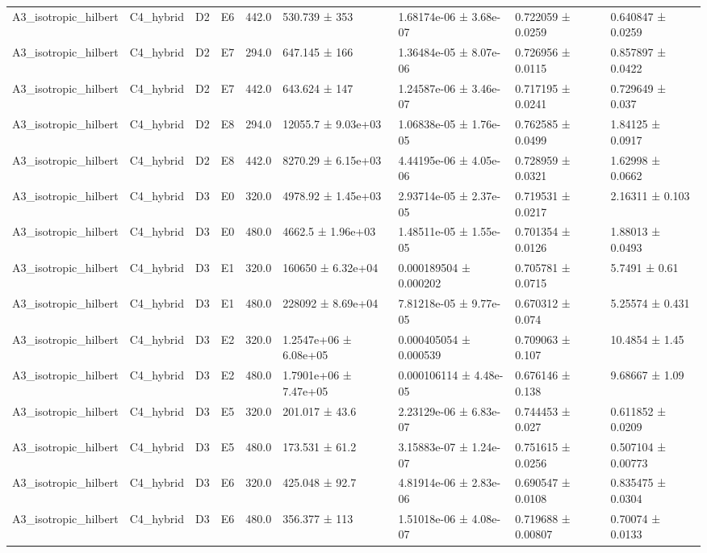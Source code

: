 \begin{table}
\begin{tabular}{lllllllll}
A3\_isotropic\_hilbert & C4\_hybrid & D2 & E6 & 442.0 & 530.739 ± 353 & 1.68174e-06 ± 3.68e-07 & 0.722059 ± 0.0259 & 0.640847 ± 0.0259 \\
A3\_isotropic\_hilbert & C4\_hybrid & D2 & E7 & 294.0 & 647.145 ± 166 & 1.36484e-05 ± 8.07e-06 & 0.726956 ± 0.0115 & 0.857897 ± 0.0422 \\
A3\_isotropic\_hilbert & C4\_hybrid & D2 & E7 & 442.0 & 643.624 ± 147 & 1.24587e-06 ± 3.46e-07 & 0.717195 ± 0.0241 & 0.729649 ± 0.037 \\
A3\_isotropic\_hilbert & C4\_hybrid & D2 & E8 & 294.0 & 12055.7 ± 9.03e+03 & 1.06838e-05 ± 1.76e-05 & 0.762585 ± 0.0499 & 1.84125 ± 0.0917 \\
A3\_isotropic\_hilbert & C4\_hybrid & D2 & E8 & 442.0 & 8270.29 ± 6.15e+03 & 4.44195e-06 ± 4.05e-06 & 0.728959 ± 0.0321 & 1.62998 ± 0.0662 \\
A3\_isotropic\_hilbert & C4\_hybrid & D3 & E0 & 320.0 & 4978.92 ± 1.45e+03 & 2.93714e-05 ± 2.37e-05 & 0.719531 ± 0.0217 & 2.16311 ± 0.103 \\
A3\_isotropic\_hilbert & C4\_hybrid & D3 & E0 & 480.0 & 4662.5 ± 1.96e+03 & 1.48511e-05 ± 1.55e-05 & 0.701354 ± 0.0126 & 1.88013 ± 0.0493 \\
A3\_isotropic\_hilbert & C4\_hybrid & D3 & E1 & 320.0 & 160650 ± 6.32e+04 & 0.000189504 ± 0.000202 & 0.705781 ± 0.0715 & 5.7491 ± 0.61 \\
A3\_isotropic\_hilbert & C4\_hybrid & D3 & E1 & 480.0 & 228092 ± 8.69e+04 & 7.81218e-05 ± 9.77e-05 & 0.670312 ± 0.074 & 5.25574 ± 0.431 \\
A3\_isotropic\_hilbert & C4\_hybrid & D3 & E2 & 320.0 & 1.2547e+06 ± 6.08e+05 & 0.000405054 ± 0.000539 & 0.709063 ± 0.107 & 10.4854 ± 1.45 \\
A3\_isotropic\_hilbert & C4\_hybrid & D3 & E2 & 480.0 & 1.7901e+06 ± 7.47e+05 & 0.000106114 ± 4.48e-05 & 0.676146 ± 0.138 & 9.68667 ± 1.09 \\
A3\_isotropic\_hilbert & C4\_hybrid & D3 & E5 & 320.0 & 201.017 ± 43.6 & 2.23129e-06 ± 6.83e-07 & 0.744453 ± 0.027 & 0.611852 ± 0.0209 \\
A3\_isotropic\_hilbert & C4\_hybrid & D3 & E5 & 480.0 & 173.531 ± 61.2 & 3.15883e-07 ± 1.24e-07 & 0.751615 ± 0.0256 & 0.507104 ± 0.00773 \\
A3\_isotropic\_hilbert & C4\_hybrid & D3 & E6 & 320.0 & 425.048 ± 92.7 & 4.81914e-06 ± 2.83e-06 & 0.690547 ± 0.0108 & 0.835475 ± 0.0304 \\
A3\_isotropic\_hilbert & C4\_hybrid & D3 & E6 & 480.0 & 356.377 ± 113 & 1.51018e-06 ± 4.08e-07 & 0.719688 ± 0.00807 & 0.70074 ± 0.0133 \\

\end{tabular}
\end{table}
